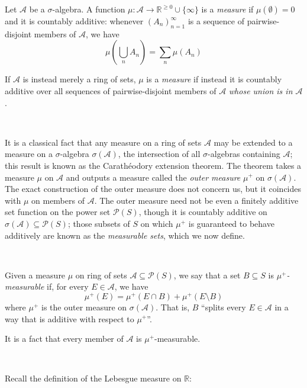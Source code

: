 \documentclass[11pt]{amsart}
\theoremstyle{remark}
\newcommand{\powerset}{\mathcal{P}}
\begin{document}
\pagebreak

\begin{defn}[Measure]
Let $\mathcal{A}$ be a $\sigma$-algebra.
A function $\mu: \mathcal{A} \to \mathbb{R}^{\geq 0} \cup \{ \infty \}$ is a \emph{measure} if $\mu(\emptyset) = 0$ and it is countably additive: whenever $(A_n)_{n=1}^{\infty}$ is a sequence of pairwise-disjoint members of $\mathcal{A}$, we have $$\mu \left(\bigcup_n A_n \right) = \sum_n \mu(A_n)$$

If $\mathcal{A}$ is instead merely a ring of sets, $\mu$ is a \emph{measure} if instead it is countably additive over all sequences of pairwise-disjoint members of $\mathcal{A}$ \emph{whose union is in $\mathcal{A}$}.
\end{defn}

\

It is a classical fact that any measure on a ring of sets $\mathcal{A}$ may be extended to a measure on a $\sigma$-algebra $\sigma(\mathcal{A})$, the intersection of all $\sigma$-algebras containing $\mathcal{A}$; this result is known as the Carath\'eodory extension theorem.
The theorem takes a measure $\mu$ on $\mathcal{A}$ and outputs a measure called the \emph{outer measure} $\mu^+$ on $\sigma(\mathcal{A})$.
The exact construction of the outer measure does not concern us, but it coincides with $\mu$ on members of $\mathcal{A}$.
The outer measure need not be even a finitely additive set function on the power set $\powerset(S)$, though it is countably additive on $\sigma(\mathcal{A}) \subseteq \powerset(S)$; those subsets of $S$ on which $\mu^+$ is guaranteed to behave additively are known as the \emph{measurable sets}, which we now define.

\

\begin{defn} \label{defn:measurable}
Given a measure $\mu$ on ring of sets $\mathcal{A} \subseteq \powerset(S)$, we say that a set $B \subseteq S$ is \emph{$\mu^+$-measurable} if, for every $E \in \mathcal{A}$, we have $$\mu^+(E) = \mu^+(E \cap B) + \mu^+(E \setminus B)$$ 
where $\mu^+$ is the outer measure on $\sigma(\mathcal{A})$.
That is, $B$ ``splits every $E \in \mathcal{A}$ in a way that is additive with respect to $\mu^+$''. 

It is a fact that every member of $\mathcal{A}$ is $\mu^+$-measurable.
\end{defn}

\

Recall the definition of the Lebesgue measure on $\mathbb{R}$:
\end{document}
